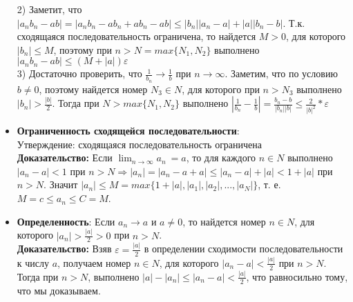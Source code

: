 \documentclass[12pt,a4paper]{article}
\begin{document}
\begin{itemize}
    2) Заметит, что $|a_n b_n - a b| = |a_n b_n - a b_n + a b_n - a b| \leq |b_n| |a_n - a| + |a| |b_n - b|$. Т.к. сходящаяся последовательность ограничена, то найдется $M > 0$, для которого $|b_n| \leq M$, поэтому при  $n > N = max\{ N_1, N_2\}$ выполнено $|a_n b_n - a b| \leq (M + |a|)\varepsilon$\\
    3) Достаточно проверить, что $\frac{1}{b_n} \to \frac{1}{b}$ при $n \to \infty$. Заметим, что по условию $b \neq 0$, поэтому найдется номер $N_3 \in N$, для которого при $n > N_3$ выполнено $|b_n| > \frac{|b|}{2}$. Тогда при $N > max \{N_1, N_2\}$ выполнено $|\frac{1}{b_n} - \frac{1}{b}| = \frac{b_n - b}{|b_n| |b|} \leq \frac{2}{|b|^2} * \varepsilon$\\
    \item \textbf{Ограниченность сходящейся последовательности}:\\
    Утверждение: сходящаяся последовательность ограничена\\
    \textbf{Доказательство:} Если $\lim_{n \to \infty} a_n\ = a$, то для каждого $n \in N$ выполнено  
    $|a_n - a| < 1$ при $n > N  \Rightarrow |a_n| = |a_n - a + a| \leq |a_n - a| + |a| < 1 + |a|$ при $n > N$.
    Значит $|a_n| \leq M = max\{1 + |a|, |a_1|, |a_2|, ..., |a_N|\}$, т. е. $M = c \leq a_n \leq C = M$.\\
    \item \textbf{Определенность}:
    Если $a_n \to a$ и $a \neq 0$, то найдется номер $n \in N$, для которого $|a_n| > \frac{|a|}{2} > 0$ при $n > N$.\\
    \textbf{Доказательство:} Взяв $\varepsilon = \frac{|a|}{2}$ в определении сходимости последовательности к числу $a$, получаем номер $n \in N$, для которого $|a_n - a| < \frac{|a|}{2}$ при $n > N$. Тогда при $n > N$, выполнено $|a| - |a_n| \leq |a_n - a| < \frac{|a|}{2}$, что равносильно тому, что мы доказываем.
  
\end{itemize}
\end{document}
